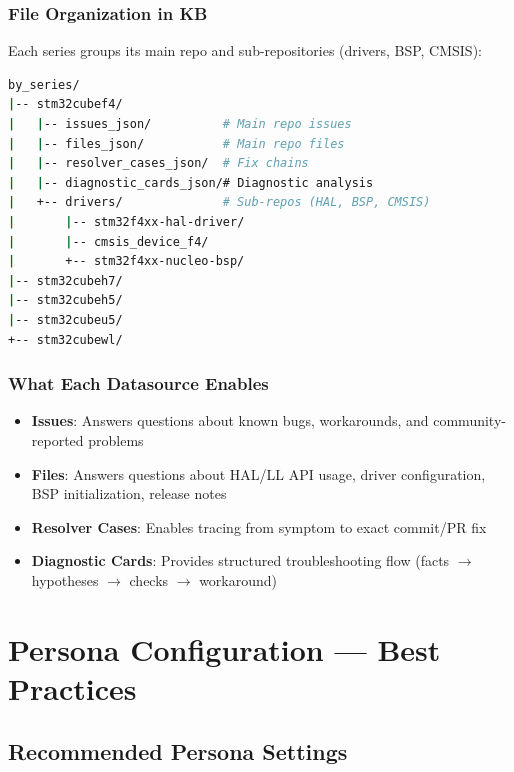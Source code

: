 \documentclass[12pt,a4paper]{report}
\begin{document}
\subsection{File Organization in KB}

Each series groups its main repo and sub-repositories (drivers, BSP, CMSIS):

\begin{lstlisting}[language=bash]
by_series/
|-- stm32cubef4/
|   |-- issues_json/          # Main repo issues
|   |-- files_json/           # Main repo files
|   |-- resolver_cases_json/  # Fix chains
|   |-- diagnostic_cards_json/# Diagnostic analysis
|   +-- drivers/              # Sub-repos (HAL, BSP, CMSIS)
|       |-- stm32f4xx-hal-driver/
|       |-- cmsis_device_f4/
|       +-- stm32f4xx-nucleo-bsp/
|-- stm32cubeh7/
|-- stm32cubeh5/
|-- stm32cubeu5/
+-- stm32cubewl/
\end{lstlisting}

\subsection{What Each Datasource Enables}

\begin{itemize}
  \item \textbf{Issues}: Answers questions about known bugs, workarounds, and community-reported problems
  \item \textbf{Files}: Answers questions about HAL/LL API usage, driver configuration, BSP initialization, release notes
  \item \textbf{Resolver Cases}: Enables tracing from symptom to exact commit/PR fix
  \item \textbf{Diagnostic Cards}: Provides structured troubleshooting flow (facts $\to$ hypotheses $\to$ checks $\to$ workaround)
\end{itemize}

\chapter{Persona Configuration --- Best Practices}

\section{Recommended Persona Settings}
\end{document}
